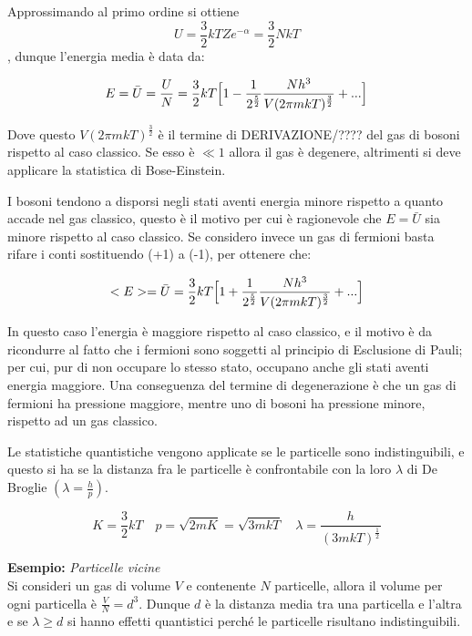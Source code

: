 Approssimando al primo ordine si ottiene 
\begin{equation}
U = \frac{ 3}{2 } k T Z e^{ - \alpha} = \frac{ 3}{2 } N k T
\end{equation},
dunque l'energia media è data da:

\begin{equation}
E = \bar U = \frac{ U}{N } = \frac{ 3}{2 } k T \Bigl[ 1 - \frac{ 1}{2^{ \frac{ 5}{2 }} } \frac{ N h^3}{V (2 \pi m k T)^{ \frac{ 3}{2 }} } + ... \Bigr]
\end{equation}

Dove questo $V (2 \pi m k T)^{ \frac{ 3}{2 }} $ è il termine di DERIVAZIONE/???? del gas di bosoni rispetto al caso classico.
Se esso è $\ll 1$ allora il gas è degenere, altrimenti si deve applicare la statistica di Bose-Einstein.

I bosoni tendono a disporsi negli stati aventi energia minore rispetto a quanto accade nel gas classico, 
questo è il motivo per cui è ragionevole che $E = \bar U$ sia minore rispetto al caso classico.
Se considero invece un gas di fermioni basta rifare i conti sostituendo (+1) a (-1), per ottenere che:

\begin{equation}
<E> = \bar U = \frac{ 3}{2 } k T \Bigl[  1 + \frac{ 1}{2^{ \frac{ 5}{2 }}} \frac{ N h^3}{ V (2 \pi m k T)^{ \frac{ 3}{2 }} } + ...  \Bigr]
\end{equation}

In questo caso l'energia è maggiore rispetto al caso classico, e il motivo è da ricondurre al fatto che i fermioni sono soggetti al principio di Esclusione di Pauli;
per cui, pur di non occupare lo stesso stato, occupano anche gli stati aventi energia maggiore.
Una conseguenza del termine di degenerazione è che un gas di fermioni ha pressione maggiore, 
mentre uno di bosoni ha pressione minore, rispetto ad un gas classico.

Le statistiche quantistiche vengono applicate se le particelle sono indistinguibili, e questo si ha se la distanza fra le particelle è confrontabile con la loro $\lambda$ di De Broglie $(\lambda = \frac{ h}{p })$.

$$ K = \frac{ 3}{2} k T \quad p= \sqrt{2mK} = \sqrt{3mkT} \quad \lambda = \frac{ h}{(3mkT)^{ \frac{ 1}{2}}} $$


\textbf{Esempio:} \textit{Particelle vicine}\\
Si consideri un gas di volume $V$ e contenente $N$ particelle, allora il volume per ogni particella è $\frac{ V}{N} = d^3$.
Dunque $d$ è la distanza media tra una particella e l'altra e se $\lambda \ge d$ si hanno effetti quantistici perché le particelle risultano indistinguibili.

